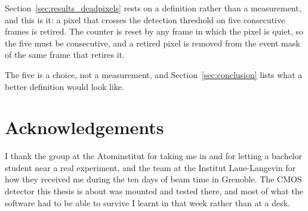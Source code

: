 \documentclass[a4paper,headsepline,oneside,11pt]{scrartcl}
\begin{document}
Section~\ref{sec:results_deadpixels} rests on a definition rather than a
measurement, and this is it: a pixel that crosses the detection threshold on five
consecutive frames is retired. The counter is reset by any frame in which the
pixel is quiet, so the five must be consecutive, and a retired pixel is removed
from the event mask of the same frame that retires it.

\noindent\begin{minipage}[t]{\linewidth}

\end{minipage}

The five is a choice, not a measurement, and
Section~\ref{sec:conclusion} lists what a better definition would look like.

\clearpage

\section*{Acknowledgements}

I thank the \qbounce{} group at the Atominstitut for taking me in and for letting a
bachelor student near a real experiment, and the team at the Institut
Laue-Langevin for how they received me during the ten days of beam time in
Grenoble. The CMOS detector this thesis is about was mounted and tested there,
and most of what the software had to be able to survive I learnt in that week
rather than at a desk.

\clearpage
\printbibliography[heading=bibintoc]
\end{document}
